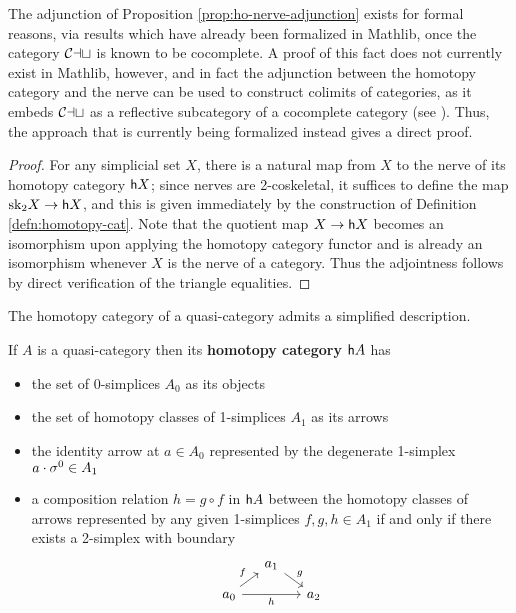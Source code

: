    The adjunction of Proposition \ref{prop:ho-nerve-adjunction} exists for formal reasons, via results which have already been formalized in Mathlib, %
   once the category ${\mathord{\mathcal{Cat}}}$ is known to be cocomplete. A proof of this fact does not currently exist in Mathlib, however, and in fact the adjunction between the homotopy category and the nerve can be used to construct colimits of categories, as it embeds ${\mathord{\mathcal{Cat}}}$ as a reflective subcategory of a cocomplete category (see \cite[4.5.16]{Riehl:2016cc}). Thus, the approach that is currently being formalized instead gives a direct proof.

   \begin{proof}
   For any simplicial set $X$, there is a natural map from $X$ to the nerve of its homotopy category ${\mathord{\mathsf{h}}}{X}$; since nerves are 2-coskeletal, it suffices to define the map $\textup{sk}_2X \to {\mathord{\mathsf{h}}}{X}$, and this is given immediately by the construction of Definition \ref{defn:homotopy-cat}. Note that the quotient map $X \to {\mathord{\mathsf{h}}}{X}$ becomes an isomorphism upon applying the homotopy category functor and is already an isomorphism whenever $X$ is the nerve of a category. Thus the adjointness follows %
    by direct verification of the triangle equalities.
   \end{proof}

   The homotopy category of a quasi-category admits a simplified description.

   \begin{lem}\label{lem:htpy-cat-of-qcat} If $A$ is a quasi-category then its \textbf{homotopy category} ${\mathord{\mathsf{h}}}{A}$ has
   \begin{itemize}
   \item the set of 0-simplices $A_0$ as its objects
   \item the set of homotopy classes of 1-simplices $A_1$ as its arrows
   \item the identity arrow at $a \in A_0$ represented by the degenerate 1-simplex $a \cdot \sigma^0 \in A_1$
   \item a composition relation $h = g \circ f$ in ${\mathord{\mathsf{h}}}{A}$ between the homotopy classes of arrows represented by any given 1-simplices $f,g,h \in A_1$ if and only if there exists a 2-simplex with boundary
   \[
   \begin{tikzcd}[row sep=small, column sep=small]
   & a_1 \arrow[dr, "g"] \\ a_0 \arrow[ur, "f"] \arrow[rr, "h"'] & & a_2
   \end{tikzcd}
   \]
   \end{itemize}
   \end{lem}

